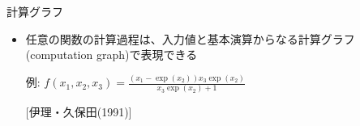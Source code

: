 \begin{frame}[t,fragile]{計算グラフ}
  \begin{itemize}
  \item 任意の関数の計算過程は、入力値と基本演算からなる計算グラフ(computation graph)で表現できる

    例: $\displaystyle f(x_1,x_2,x_3) = \frac{(x_1 - \exp(x_2)) x_3 \exp(x_2)}{x_3 \exp(x_2) + 1}$
    \begin{center}
    \end{center}
    \vspace*{-2em} \hfill {\footnotesize [伊理・久保田(1991)]}
  \end{itemize}
\end{frame}
